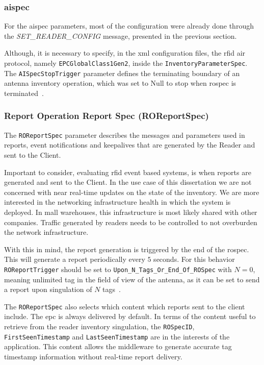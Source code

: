 \subsubsection{\acl{aispec}}

For the \ac{aispec} parameters, most of the configuration were already done through the \textit{SET\_READER\_CONFIG} message, presented in the previous section.

Although, it is necessary to specify, in the \ac{xml} configuration files, the \ac{rfid} air protocol, namely \texttt{EPCGlobalClass1Gen2}, inside the \texttt{InventoryParameterSpec}.
The \texttt{AISpecStopTrigger} parameter defines the terminating boundary of an antenna inventory operation, which was set to Null to stop when \ac{rospec} is terminated~\cite{LowLevelReader}.

\subsubsection{Report Operation Report Spec (ROReportSpec)}

The \texttt{ROReportSpec} parameter describes the messages and parameters used in reports, event notifications and keepalives that are generated by the Reader and sent to the Client.

Important to consider, evaluating \ac{rfid} event based systems, is when reports are generated and sent to the Client.
In the use case of this dissertation we are not concerned with near real-time updates on the state of the inventory. We are more interested in the networking infrastructure health in which the system is deployed. In mall warehouses, this infrastructure is most likely shared with other companies. Traffic generated by readers needs to be controlled to not overburden the network infrastructure.

With this in mind, the report generation is triggered by the end of the \ac{rospec}. This will generate a report periodically every $5$ seconds.
For this behavior \texttt{ROReportTrigger} should be set to \texttt{Upon\_N\_Tags\_Or\_End\_Of\_ROSpec} with $N=0$, meaning unlimited tag in the field of view of the antenna, as it can be set to send a report upon singulation of $N$ tags~\cite{LowLevelReader}.

The \texttt{ROReportSpec} also selects which content which reports sent to the client include.
The \ac{epc} is always delivered by default.
In terms of the content useful to retrieve from the reader inventory singulation, the \texttt{ROSpecID}, \texttt{FirstSeenTimestamp} and \texttt{LastSeenTimestamp} are in the interests of the application. 
This content allows the middleware to generate accurate tag timestamp information without real-time report delivery.

